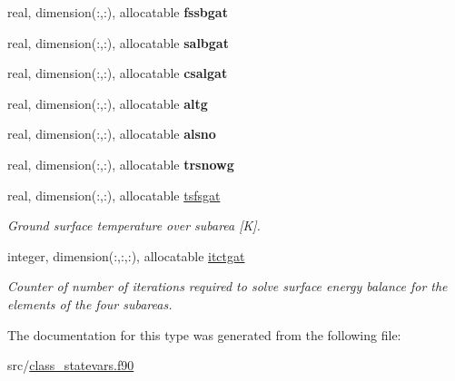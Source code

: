 \begin{DoxyCompactItemize}
\item 
\hypertarget{structclass__statevars_1_1class__gather_a6f56a49baaca33109ce8fa2adf0ca252}{}real, dimension(\+:,\+:), allocatable {\bfseries fssbgat}\label{structclass__statevars_1_1class__gather_a6f56a49baaca33109ce8fa2adf0ca252}

\item 
\hypertarget{structclass__statevars_1_1class__gather_ad83d84c4449233c736d92aa75ba1862f}{}real, dimension(\+:,\+:), allocatable {\bfseries salbgat}\label{structclass__statevars_1_1class__gather_ad83d84c4449233c736d92aa75ba1862f}

\item 
\hypertarget{structclass__statevars_1_1class__gather_a782cf40162295390853a605eab96ea87}{}real, dimension(\+:,\+:), allocatable {\bfseries csalgat}\label{structclass__statevars_1_1class__gather_a782cf40162295390853a605eab96ea87}

\item 
\hypertarget{structclass__statevars_1_1class__gather_a218f3cf57d261364155b351271d9513f}{}real, dimension(\+:,\+:), allocatable {\bfseries altg}\label{structclass__statevars_1_1class__gather_a218f3cf57d261364155b351271d9513f}

\item 
\hypertarget{structclass__statevars_1_1class__gather_aa838f6bcdf0d7f1f9939e5884c5d60b3}{}real, dimension(\+:,\+:), allocatable {\bfseries alsno}\label{structclass__statevars_1_1class__gather_aa838f6bcdf0d7f1f9939e5884c5d60b3}

\item 
\hypertarget{structclass__statevars_1_1class__gather_ab91c70dd9c7fbb0ad3eee7a0ecc89689}{}real, dimension(\+:,\+:), allocatable {\bfseries trsnowg}\label{structclass__statevars_1_1class__gather_ab91c70dd9c7fbb0ad3eee7a0ecc89689}

\item 
\hypertarget{structclass__statevars_1_1class__gather_ae3429a45b9e2c931aa67625621c0ac6e}{}real, dimension(\+:,\+:), allocatable \hyperlink{structclass__statevars_1_1class__gather_ae3429a45b9e2c931aa67625621c0ac6e}{tsfsgat}\label{structclass__statevars_1_1class__gather_ae3429a45b9e2c931aa67625621c0ac6e}

\begin{DoxyCompactList}\small\item\em Ground surface temperature over subarea \mbox{[}K\mbox{]}. \end{DoxyCompactList}\item 
\hypertarget{structclass__statevars_1_1class__gather_a1945be55cbfc1d925a898b5e91758644}{}integer, dimension(\+:,\+:,\+:), allocatable \hyperlink{structclass__statevars_1_1class__gather_a1945be55cbfc1d925a898b5e91758644}{itctgat}\label{structclass__statevars_1_1class__gather_a1945be55cbfc1d925a898b5e91758644}

\begin{DoxyCompactList}\small\item\em Counter of number of iterations required to solve surface energy balance for the elements of the four subareas. \end{DoxyCompactList}\end{DoxyCompactItemize}


The documentation for this type was generated from the following file\+:\begin{DoxyCompactItemize}
\item 
src/\hyperlink{class__statevars_8f90}{class\+\_\+statevars.\+f90}\end{DoxyCompactItemize}

